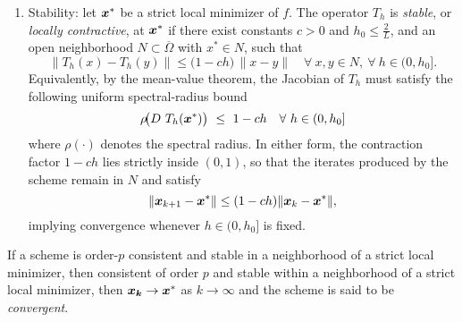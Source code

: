 \documentclass[10pt]{article}
\begin{document}
\begin{definition}
\begin{enumerate}
                \item Stability: let $\bm{x}^*$ be a strict local minimizer of $f$. The operator $T_h$ is 
                    \emph{stable}, or \emph{locally contractive}, at $\bm{x}^*$ if there exist constants 
                    $c>0$ and $h_0 \le \frac{2}{L}$, and an open neighborhood $N\subset \overline{\Omega}$ 
                    with $x^*\in N$, such that
                    $$
                        \| T_h(x) - T_h(y) \| \le \bigl(1 - c h \bigr)\, \| x - y \| \quad\forall~x,y\in N,~\forall~ h \in (0, h_0].
                    $$
                    Equivalently, by the mean-value theorem, the Jacobian of $T_h$ must satisfy the following uniform spectral-radius bound
                    $$
                        \rho\!\bigl(D~T_h(\bm{x}^*)\bigr) ~ \le ~ 1 - ch \quad \forall~ h \in(0,h_0]
                    $$
                    where $\rho(\cdot)$ denotes the spectral radius.  In either form, the contraction factor
                    $1 - c h$ lies strictly inside $(0, 1)$, so that the iterates produced by the scheme remain 
                    in $N$ and satisfy
                    $$
                        \|\bm{x}_{k+1} - \bm{x}^*\| \le (1  - ch) \|\bm{x}_k - \bm{x}^*\|,
                    $$
                    implying convergence whenever $h\in(0,h_0]$ is fixed.
            \end{enumerate}
            If a scheme is order-$p$ consistent and stable in a neighborhood of a strict local minimizer,
            then consistent of order $p$ and stable within a neighborhood of a strict local minimizer, then 
            $\bm{x_k} \rightarrow \bm{x}^*$ as $k\to\infty$ and the scheme is said to be \emph{convergent}.
        \end{definition}
\end{document}
